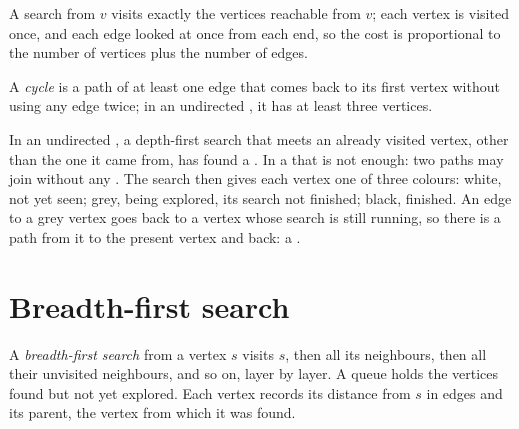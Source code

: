 A search from $v$ visits exactly the vertices reachable from $v$; each vertex is visited once, and each edge looked at
once from each end, so the cost is proportional to the number of vertices plus the number of edges.

\begin{definition}[Cycle]\label{def:g12:graph-algorithms:cycle}
A \emph{cycle} is a path of at least one edge that comes back to its first vertex without using any edge
twice; in an undirected , it has at least three vertices.
\end{definition}

In an undirected , a depth-first search that meets an already visited vertex, other than the one it came from,
has found a . In a  that is not enough: two paths may join without any . The search then gives
each vertex one of three colours: white, not yet seen; grey, being explored, its search not finished; black,
finished. An edge to a grey vertex goes back to a vertex whose search is still running, so there is a path from it
to the present vertex and back: a .

\label{lst:g12:graph-algorithms:cycle-u}

\label{lst:g12:graph-algorithms:cycle-d}

\label{out:g12:graph-algorithms:cycle}

\section{Breadth-first search}\label{sec:g12:graph-algorithms:bfs}

\begin{method}\label{def:g12:graph-algorithms:bfs}
A \emph{breadth-first search} from a vertex $s$ visits $s$, then all its neighbours, then
all their unvisited neighbours, and so on, layer by layer. A queue holds the vertices found but not yet explored. Each
vertex records its distance from $s$ in edges and its parent, the vertex from which it was found.
\end{method}

